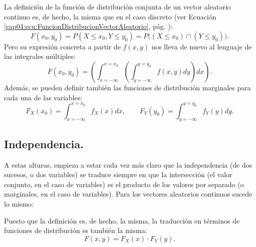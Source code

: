 La definición de la función de distribución conjunta de un vector aleatorio continuo es, de hecho, la misma que  en el caso discreto (ver Ecuación \ref{cap04:ecu:FuncionDistribucionVectorAleatorio}, pág. \pageref{cap04:ecu:FuncionDistribucionVectorAleatorio}):
\begin{equation}
\label{cap04:ecu:FuncionDistribucionVectorAleatorioContinuo}
F(x_0, y_0) = P(X\leq x_0, Y\leq y_0)=P\bigg((X\leq x_0)\cap(Y\leq y_0)\bigg).
\end{equation}
Pero su expresión concreta a partir de $f(x,y)$ nos lleva de nuevo al lenguaje de las integrales múltiples:
\[
F(x_0, y_0) =
\left(\int_{x=-\infty}^{x=x_0}
        \left(\int_{y=-\infty}^{y=y_0}
        f(x,y) dy\right)dx\right).
\]
Además, se pueden definir también las funciones de distribución marginales para cada una de las variables:
\[
F_X(x_0) = \int_{x=-\infty}^{x=x_0} f_X(x) dx, \qquad F_Y(y_0) = \int_{y=-\infty}^{y=y_0} f_Y(y) dy.
\]


\subsection{Independencia.}
\label{cap05:subsec:IndependenciaVectorAleatorioContinuo}

A estas alturas, empieza a estar cada vez más claro que la independencia (de dos sucesos, o dos variables) se traduce siempre en que la intersección (el valor conjunto, en el caso de variables) es el producto de los valores por separado (o marginales, en el caso de variables). Para los vectores aleatorios continuos sucede lo mismo:
    \begin{center}
    \end{center}
Puesto que la definición es, de hecho, la misma, la traducción en términos de funciones de distribución es también la misma:
    \begin{equation}
    \label{cap04:ecu:indepedenciaVariablesAleatoriasContinuasFDistribucion}
    F(x,y)=F_X(x)\cdot F_Y(y).
    \end{equation}

